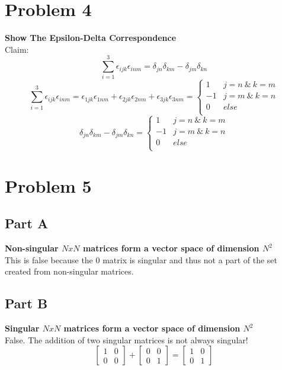 \documentclass[10pt,a4paper]{article}
\begin{document}
	\section{Problem 4}
	\textbf{Show The Epsilon-Delta Correspondence}\\
	Claim: 
	$$\sum_{i=1}^3 \epsilon_{ijk}\epsilon_{inm} = \delta_{jn}\delta_{km}-\delta_{jm}\delta_{kn}  $$
	$$
		\sum_{i=1}^3 \epsilon_{ijk}\epsilon_{inm} = \epsilon_{1jk}\epsilon_{1nm} + \epsilon_{2jk}\epsilon_{2nm} + \epsilon_{3jk}\epsilon_{3nm}
		=  \left\{
		\begin{array}{ll}
		1 & j=n \ \& \ k=m\\
		-1 & j=m \ \& \ k=n \\
		0 & else \\
		\end{array} 
		\right.
	$$
	$$
	\delta_{jn}\delta_{km}-\delta_{jm}\delta_{kn}
	=  \left\{
	\begin{array}{ll}
	1 & j=n \ \& \ k=m\\
	-1 & j=m \ \& \ k=n \\
	0 & else \\
	\end{array} 
	\right.
	$$

	\section{Problem 5}
	\subsection{Part A}
	\textbf{Non-singular $NxN$ matrices form a vector space of dimension $N^2$}\\
	This is false because the $0$ matrix is singular and thus not a part of the set created from non-singular matrices.
	\subsection{Part B}
	\textbf{Singular $NxN$ matrices form a vector space of dimension $N^2$}\\
	 False. The addition of two singular matrices is not always singular!
	 \begin{equation}
	 	\begin{bmatrix}
		 	1 & 0\\
		 	0 & 0
	 	\end{bmatrix}
	 	+
	 	\begin{bmatrix}
		 	0 & 0\\
		 	0 & 1
	 	\end{bmatrix}
	 	=
	 	\begin{bmatrix}
		 	1 & 0 \\
		 	0 & 1
	 	\end{bmatrix}
	 \end{equation}
\end{document}

